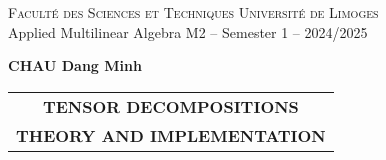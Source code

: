 \documentclass[11pt,a4paper]{article}
\begin{document}
\thispagestyle{empty}
\begin{center}

  \textsc{Facult\'e des Sciences et Techniques}  \hfill \textsc{Universit\'e de Limoges} \\
  Applied Multilinear Algebra \hfill M2 -- Semester 1 -- 2024/2025 \\
  \bigskip

  {\bf
    \vspace{0.9cm}
    \vspace{0.2cm}
    CHAU Dang Minh
  }
\end{center}
\bigskip

\vspace{7cm}

\renewcommand{\arraystretch}{2}
\begin{center}
  \begin{tabular}{c}
    \hline
    {\textbf{{\Large  TENSOR DECOMPOSITIONS}}}     \\
    {\textbf{{\Large  THEORY AND IMPLEMENTATION}}} \\
    \hline
  \end{tabular}
\end{center}

\vspace{0.5cm}
\pagestyle{plain}

\printbibliography
\end{document}
